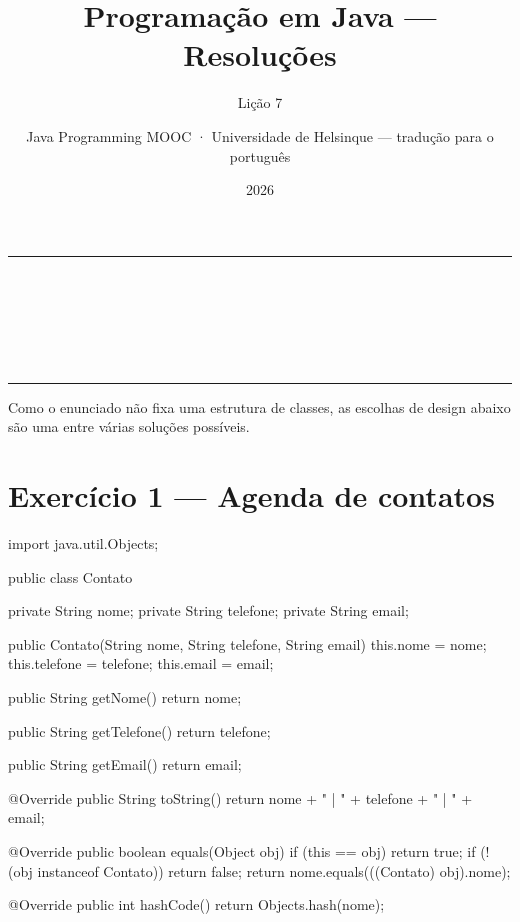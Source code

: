 \documentclass[11pt,a4paper]{article}
\title{Programação em Java — Resoluções}
\subtitle{Lição 7}
\author{Java Programming MOOC · Universidade de Helsinque — tradução para o português}
\date{2026}
\makeatletter
\renewcommand{\maketitle}{%
  \begin{center}
    {\color{javaRule}\rule{\linewidth}{1pt}}\\[6pt]
    {\Huge\sffamily\bfseries\color{javaOrange} \@title}\\[6pt]
    \ifx\@subtitle\undefined\else
      {\Large\sffamily\color{javaDeep} \@subtitle}\\[4pt]
    \fi
    {\small\sffamily\color{gray} \@author}\\[2pt]
    {\small\sffamily\color{gray} \@date}\\[6pt]
    {\color{javaRule}\rule{\linewidth}{1pt}}
  \end{center}
  \vspace{1em}
}
\makeatother
\begin{document}
\maketitle
\tableofcontents
\vspace{1.5em}

Como o enunciado não fixa uma estrutura de classes, as escolhas de design abaixo são uma entre várias soluções possíveis.

\section{Exercício 1 --- Agenda de contatos}

\begin{javacode}
import java.util.Objects;

public class Contato {
    private String nome;
    private String telefone;
    private String email;

    public Contato(String nome, String telefone, String email) {
        this.nome = nome;
        this.telefone = telefone;
        this.email = email;
    }

    public String getNome() {
        return nome;
    }

    public String getTelefone() {
        return telefone;
    }

    public String getEmail() {
        return email;
    }

    @Override
    public String toString() {
        return nome + " | " + telefone + " | " + email;
    }

    @Override
    public boolean equals(Object obj) {
        if (this == obj) return true;
        if (!(obj instanceof Contato)) return false;
        return nome.equals(((Contato) obj).nome);
    }

    @Override
    public int hashCode() {
        return Objects.hash(nome);
    }
}
\end{javacode}
\end{document}
